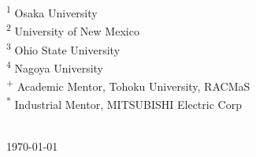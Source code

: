 \documentclass{article}
\numberwithin{equation}{section}
\theoremstyle{definition}
\begin{document}
\begin{titlepage}
\begin{minipage}{0.35\textwidth}
\begin{flushleft}
\textsuperscript{1} Osaka University\\
\textsuperscript{2} University of New Mexico\\
\textsuperscript{3} Ohio State University \\
\textsuperscript{4} Nagoya University \\
\textsuperscript{+} Academic Mentor, Tohoku University,
RACMaS
\\
\textsuperscript{*} Industrial Mentor, MITSUBISHI Electric Corp \\

\end{flushleft}
\end{minipage}\\[2cm]



{\large \today}\\[2cm] %


 

\vfill %

\end{titlepage}

\tableofcontents \newpage
\end{document}
